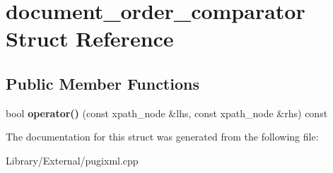 \hypertarget{structdocument__order__comparator}{}\section{document\+\_\+order\+\_\+comparator Struct Reference}
\label{structdocument__order__comparator}
\subsection*{Public Member Functions}
\begin{DoxyCompactItemize}
\item 
\hypertarget{structdocument__order__comparator_a11e471cbfa426bc9e48844c1db1a190e}{}bool {\bfseries operator()} (const xpath\+\_\+node \&lhs, const xpath\+\_\+node \&rhs) const \label{structdocument__order__comparator_a11e471cbfa426bc9e48844c1db1a190e}

\end{DoxyCompactItemize}


The documentation for this struct was generated from the following file\+:\begin{DoxyCompactItemize}
\item 
Library/\+External/pugixml.\+cpp\end{DoxyCompactItemize}
